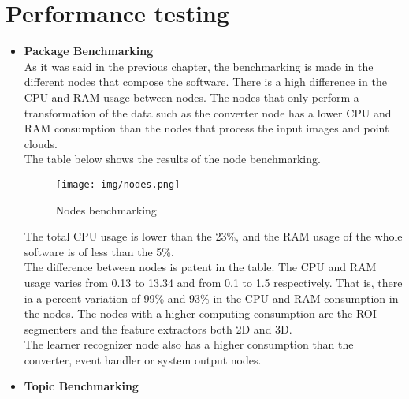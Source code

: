\section{Performance testing}

	\begin{itemize}
		\item{\textbf{Package Benchmarking}}
		\\

			As it was said in the previous chapter, the benchmarking is made in the different nodes that compose the software. 
			There is a high difference in the CPU and RAM usage between nodes.
			The nodes that only perform a transformation of the data such as the converter node has a lower CPU and RAM consumption than the nodes that process the input images and point clouds. 
			\\

			The table below shows the results of the node benchmarking. 

			\begin{figure}[h]
				\begin{center}
			    \texttt{[image: img/nodes.png]}
				\caption[Nodes benchmarking]{Nodes benchmarking}
				\end{center}
			\end{figure}

			The total CPU usage is lower than the 23\%, and the RAM usage of the whole software is of less than the 5\%. 
			\\


			The difference between nodes is patent in the table.
			The CPU and RAM usage varies from  0.13 to 13.34 and from 0.1 to 1.5 respectively. 
			That is, there ia a percent variation of 99\% and  93\%  in the CPU and RAM consumption in the nodes. 
			The nodes with a higher computing consumption are the ROI segmenters and the feature extractors both 2D and 3D.
			\\

			The learner recognizer node also has a higher consumption than the converter, event handler or system output nodes. 
			

		\item{\textbf{Topic Benchmarking}}\\

	\end{itemize}